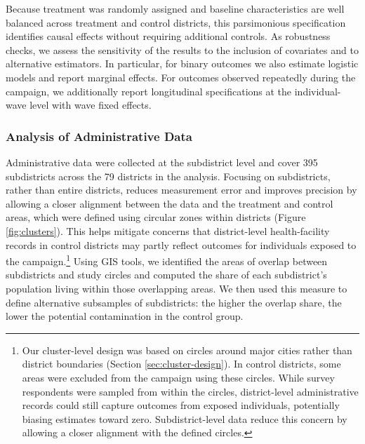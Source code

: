Because treatment was randomly assigned and baseline characteristics are well balanced across treatment and control districts, this parsimonious specification identifies causal effects without requiring additional controls. As robustness checks, we assess the sensitivity of the results to the inclusion of covariates and to alternative estimators. In particular, for binary outcomes we also estimate logistic models and report marginal effects. For outcomes observed repeatedly during the campaign, we additionally report longitudinal specifications at the individual-wave level with wave fixed effects.



\subsubsection{Analysis of Administrative Data}

Administrative data were collected at the subdistrict level and cover 395 subdistricts across the 79 districts in the analysis. Focusing on subdistricts, rather than entire districts, reduces measurement error and improves precision by allowing a closer alignment between the data and the treatment and control areas, which were defined using circular zones within districts (Figure \ref{fig:clusters}). This helps mitigate concerns that district-level health-facility records in control districts may partly reflect outcomes for individuals exposed to the campaign.\footnote{Our cluster-level design was based on circles around major cities rather than district boundaries (Section \ref{sec:cluster-design}). In control districts, some areas were excluded from the campaign using these circles. While survey respondents were sampled from within the circles, district-level administrative records could still capture outcomes from exposed individuals, potentially biasing estimates toward zero. Subdistrict-level data reduce this concern by allowing a closer alignment with the defined circles.} Using GIS tools, we identified the areas of overlap between subdistricts and study circles and computed the share of each subdistrict’s population living within those overlapping areas. We then used this measure to define alternative subsamples of subdistricts: the higher the overlap share, the lower the potential contamination in the control group.

